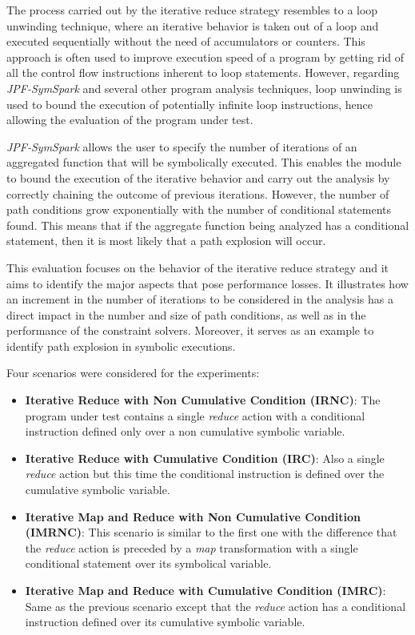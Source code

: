 
The process carried out by the iterative reduce strategy resembles to a loop unwinding technique, where an iterative behavior is taken out of a loop and executed sequentially without the need of accumulators or counters. This approach is often used to improve execution speed of a program by getting rid of all the control flow instructions inherent to loop statements. However, regarding \textit{JPF-SymSpark} and several other program analysis techniques, loop unwinding is used to bound the execution of potentially infinite loop instructions, hence allowing the evaluation of the program under test.

\textit{JPF-SymSpark} allows the user to specify the number of iterations of an aggregated function that will be symbolically executed. This enables the module to bound the execution of the iterative behavior and carry out the analysis by correctly chaining the outcome of previous iterations. However, the number of path conditions grow exponentially with the number of conditional statements found. This means that if the aggregate function being analyzed has a conditional statement, then it is most likely that a path explosion will occur.

This evaluation focuses on the behavior of the iterative reduce strategy and it aims to identify the major aspects that pose performance losses. It illustrates how an increment in the number of iterations to be considered in the analysis has a direct impact in the number and size of path conditions, as well as in the performance of the constraint solvers. Moreover, it serves as an example to identify path explosion in symbolic executions.


Four scenarios were considered for the experiments:

\begin{itemize}
	\item \textbf{Iterative Reduce with Non Cumulative Condition (IRNC)}: The program under test contains a single \textit{reduce} action with a conditional instruction defined only over a non cumulative symbolic variable.
	\item \textbf{Iterative Reduce with Cumulative Condition (IRC)}: Also a single \textit{reduce} action but this time the conditional instruction is defined over the cumulative symbolic variable.
	\item \textbf{Iterative Map and Reduce with Non Cumulative Condition (IMRNC)}: This scenario is similar to the first one with the difference that the \textit{reduce} action is preceded by a \textit{map} transformation with a single conditional statement over its symbolical variable.
	\item \textbf{Iterative Map and Reduce with Cumulative Condition (IMRC)}: Same as the previous scenario except that the \textit{reduce} action has a conditional instruction defined over its cumulative symbolic variable.
\end{itemize}

